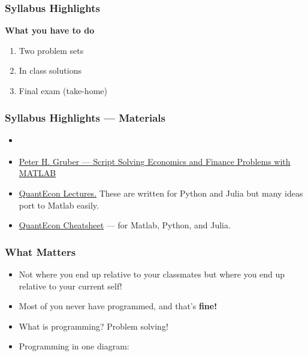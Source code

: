 \documentclass[11pt,xcolor={svgnames},aspectratio=169,usepdftitle=false]{beamer}
\begin{document}
\begin{frame}
    \frametitle{Syllabus Highlights}
    \textbf{\alert{What you have to do}}
    \begin{enumerate}
        \item Two problem sets
        \item In class solutions
        \item Final exam (take-home)
    \end{enumerate}
\end{frame}
    
\begin{frame}
  \frametitle{Syllabus Highlights --- Materials}
    \begin{itemize}
      \item \href{https://www.elsevier.com/books/matlab/attaway/978-0-323-91750-6}{}
        \item \href{https://people.lu.usi.ch/gruberp/MatlabMasterScript.pdf}{Peter H. Gruber --- Script Solving Economics and Finance Problems with MATLAB}
        \item \href{https://quantecon.org/lectures/}{QuantEcon Lectures.} These are written for Python and Julia but many ideas port to Matlab easily.
        \item \href{https://cheatsheets.quantecon.org/index.html}{QuantEcon Cheatsheet} ---  for Matlab, Python, and Julia.
    \end{itemize}
\end{frame}

\begin{frame}[c]
  \frametitle{What Matters}
 \begin{itemize}
  \item Not where you end up relative to your classmates but where you end up relative to your current self!
  \item Most of you never have programmed, and that's \alert{\textbf{fine!}} 
  \item What is programming? Problem solving!
  \item Programming in one diagram: 
 \end{itemize} 

 \begin{center}
   
 \end{center}
 
\end{frame}
\end{document}
